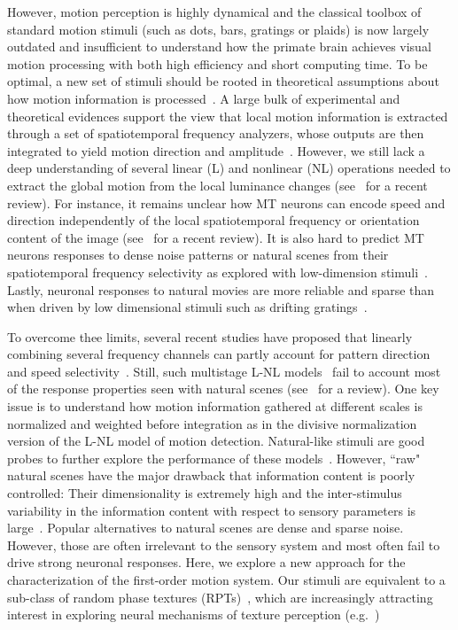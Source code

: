 \documentclass[a4paper,11pt]{article}%
\begin{document}
However, motion perception is highly dynamical and the classical toolbox of standard motion stimuli (such as dots, bars, gratings or plaids) is now largely outdated and insufficient to understand how the primate brain achieves visual motion processing with both high efficiency and short computing time. To be optimal, a new set of stimuli should be rooted in theoretical assumptions about how motion information is processed~\citep{Watson95}. A large bulk of experimental and theoretical evidences support the view that local motion information is extracted through a set of spatiotemporal frequency analyzers, whose outputs are then integrated to yield motion direction and amplitude~\citep{Adelson85,Simoncelli98}. However, we still lack a deep understanding of several linear (L) and nonlinear (NL) operations needed to extract the global motion from the local luminance changes (see~\citep{Derrington04} for a recent review). For instance, it remains unclear how MT neurons can encode speed and direction independently of the local spatiotemporal frequency or orientation content of the image (see~\citep{Bradley08} for a recent review). It is also hard to predict MT neurons responses to dense noise patterns or natural scenes from their spatiotemporal frequency selectivity as explored with low-dimension stimuli~\citep{Priebe06,Nishimoto11}. Lastly, neuronal responses to natural movies are more reliable and sparse than when driven by low dimensional stimuli such as drifting gratings~\citep{Vinje00}. %

To overcome thee limits, several recent studies have proposed that linearly combining several frequency channels can partly account for pattern direction and speed selectivity~\citep{Rust2005Spatiotemporal,Rust06,Nishimoto11}. Still, such multistage L-NL models~\citep{Heeger96,Simoncelli98} fail to account most of the response properties seen with natural scenes (see~\citep{Carandini05} for a review). One key issue is to understand how motion information gathered at different scales is normalized and weighted before integration as in the divisive normalization version of the L-NL model of motion detection. Natural-like stimuli are good probes to further explore the performance of these models~\citep{Schwartz01}. However, ``raw" natural scenes have the major drawback that information content is poorly controlled: Their dimensionality is extremely high and the inter-stimulus variability in the information content with respect to sensory parameters is large~\citep{Rust05}. Popular alternatives to natural scenes are dense and sparse noise. However, those are often irrelevant to the sensory system and most often fail to drive strong neuronal responses.  Here, we explore a new approach for the characterization of the first-order motion system. Our stimuli are  equivalent to a sub-class of random phase textures (RPTs)~\citep{Galerne10}, which are increasingly attracting interest in exploring neural mechanisms of texture perception (e.g.~\citep{Solomon10})
\end{document}
